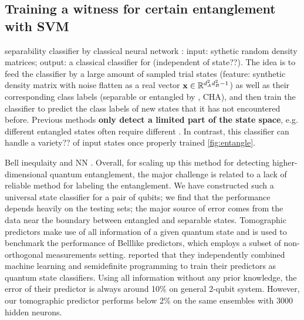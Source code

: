 \documentclass[
aps,
pra,
floatfix,
]{revtex4-2}
\theoremstyle{plain}
\theoremstyle{definition}
\begin{document}
\subsection{Training a witness for certain entanglement with SVM}

separability classifier by classical neural network \cite{luSeparabilityEntanglementClassifierMachine2018}:
input: sythetic random density matrices;
output: a classical classifier for  (independent of state??).
The idea is to feed the classifier by a large amount of sampled trial states (feature: synthetic density matrix with noise flatten as a real vector $\vb{x}\in\mathbb{R}^{d_A^2d_B^2-1}$) as well as their corresponding class labels (separable or entangled by , CHA), and then train the classifier to predict the class labels of new states that it has not encountered before.
Previous methods \textbf{only detect a limited part of the state space}, e.g. different entangled states often require different . In contrast, this classifier can handle a variety?? of input states once properly trained \cref{fig:entangle}.

Bell inequlaity and NN \cite{maTransformingBellInequalities2018}. 
Overall, for scaling up this method for detecting higher-dimensional quantum entanglement, the major challenge is related to a lack of reliable method for labeling the entanglement.
We have constructed such a universal state classiﬁer for a pair of qubits; we ﬁnd that the performance depends heavily on the testing sets; the major source of error comes from the data near the boundary between entangled and separable states.
Tomographic predictors make use of all information of a given quantum state and is used to benchmark the performance of Belllike predictors, which employs a subset of non-orthogonal measurements setting.
\cite{luSeparabilityEntanglementClassifierMachine2018} reported that they independently combined machine learning and semideﬁnite programming to train their predictors as quantum state classiﬁers. Using all information without any prior knowledge, the error of their predictor is always around 10\% on general 2-qubit system. However, our tomographic predictor performs below 2\% on the same ensembles with 3000 hidden neurons.
\end{document}
